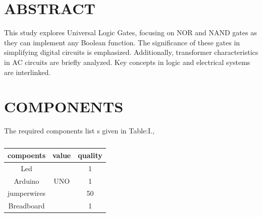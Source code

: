 \documentclass[conference]{IEEEtran}                   \IEEEoverridecommandlockouts
\begin{document}
                                        \maketitle                                                \section {ABSTRACT}
This study explores Universal Logic Gates, focusing on NOR and NAND gates as they can implement any Boolean function. The significance of these gates in simplifying digital circuits is emphasized. Additionally, transformer characteristics in AC circuits are briefly analyzed. Key concepts in logic and electrical systems are interlinked.

\section{COMPONENTS}
The required components list s given in Table:I.,
\vspace{0.3cm}
\begin{table} [htbp]
\centering
\begin{tabular}{| c| c | c |} \hline
compoents & value & quality \\\hline
Led & & 1 \\ \hline
Arduino & UNO & 1\\ \hline
jumperwires & & 50 \\ \hline
Breadboard & & 1 \\
\hline
\end{tabular}
\vspace{0.3cm}
\caption{\label{tab:widgets}}
\end{table}
\end{document}

